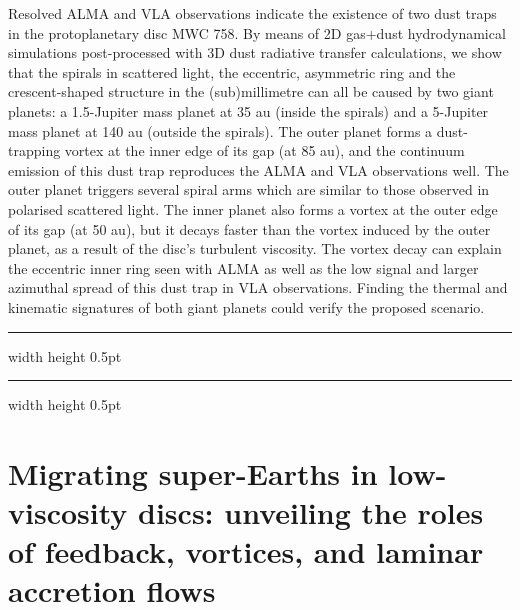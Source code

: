 \documentclass[a4paper,11pt]{book}
\def\doubleline{
\hrule width \hsize height 0.5pt  \kern 1mm \hrule width \hsize height 0.5pt 
}
\begin{document}
  
\vspace{2 mm}
\noindent Resolved ALMA and VLA observations indicate the existence of two dust traps in the protoplanetary disc MWC 758. By means of 2D gas+dust hydrodynamical simulations post-processed with 3D dust radiative transfer calculations, we show that the spirals in scattered light, the eccentric, asymmetric ring and the crescent-shaped structure in the (sub)millimetre can all be caused by two giant planets: a 1.5-Jupiter mass planet at 35 au (inside the spirals) and a 5-Jupiter mass planet at 140 au (outside the spirals). The outer planet forms a dust-trapping vortex at the inner edge of its gap (at 85 au), and the continuum emission of this dust trap reproduces the ALMA and VLA observations well. The outer planet triggers several spiral arms which are similar to those observed in polarised scattered light. The inner planet also forms a vortex at the outer edge of its gap (at 50 au), but it decays faster than the vortex induced by the outer planet, as a result of the disc’s turbulent viscosity. The vortex decay can explain the eccentric inner ring seen with ALMA as well as the low signal and larger azimuthal spread of this dust trap in VLA observations. Finding the thermal and kinematic signatures of both giant planets could verify the proposed scenario.

\noindent\doubleline
        
          \section[Migrating super-Earths in low-viscosity discs: unveiling the roles of feedback, vortices, and laminar accretion flows \newline(Colin P. McNally)] { Migrating super-Earths in low-viscosity discs: unveiling the roles of feedback, vortices, and laminar accretion flows }
\end{document}
